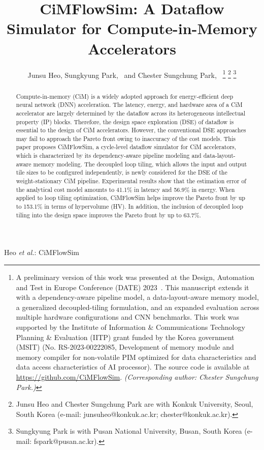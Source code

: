 \documentclass[lettersize,journal]{IEEEtran}
\begin{document}
\title{CiMFlowSim: A Dataflow Simulator for Compute-in-Memory Accelerators}

\author{Junsu Heo,
        Sungkyung Park,~
        and Chester Sungchung Park,~
\thanks{A preliminary version of this work was presented at the Design, Automation and Test in Europe Conference (DATE) 2023~\cite{eflowsim_date}. This manuscript extends it with a dependency-aware pipeline model, a data-layout-aware memory model, a generalized decoupled-tiling formulation, and an expanded evaluation across multiple hardware configurations and CNN benchmarks. This work was supported by the Institute of Information \& Communications Technology Planning \& Evaluation (IITP) grant funded by the Korea government (MSIT) (No. RS-2023-00222085, Development of memory module and memory compiler for non-volatile PIM optimized for data characteristics and data access characteristics of AI processor). The source code is available at \protect\url{https://github.com/CiMFlowSim}. \textit{(Corresponding author: Chester Sungchung Park.)}}
\thanks{Junsu Heo and Chester Sungchung Park are with Konkuk University, Seoul, South Korea (e-mail: junsuheo@konkuk.ac.kr; chester@konkuk.ac.kr).}
\thanks{Sungkyung Park is with Pusan National University, Busan, South Korea (e-mail: fspark@pusan.ac.kr).}
}

%
{Heo \MakeLowercase{\textit{et al.}}: CiMFlowSim}

\maketitle


\begin{abstract}
Compute-in-memory (CiM) is a widely adopted approach for energy-efficient deep neural network (DNN) acceleration.
The latency, energy, and hardware area of a CiM accelerator are largely determined by the dataflow across its heterogeneous intellectual property (IP) blocks.
Therefore, the design space exploration (DSE) of dataflow is essential to the design of CiM accelerators.
However, the conventional DSE approaches may fail to approach the Pareto front owing to inaccuracy of the cost models.
This paper proposes CiMFlowSim, a cycle-level dataflow simulator for CiM accelerators, which is characterized by its dependency-aware pipeline modeling and data-layout-aware memory modeling. 
The decoupled loop tiling, which allows the input and output tile sizes to be configured independently, is newly considered for the DSE of the weight-stationary CiM pipeline. 
Experimental results show that the estimation error of the analytical cost model amounts to 41.1\% in latency and 56.9\% in energy. When applied to loop tiling optimization, CiMFlowSim helps improve the Pareto front by up to 153.1\% in terms of hypervolume (HV). In addition, the inclusion of decoupled loop tiling into the design space improves the Pareto front by up to 63.7\%.
\end{abstract}
\end{document}
